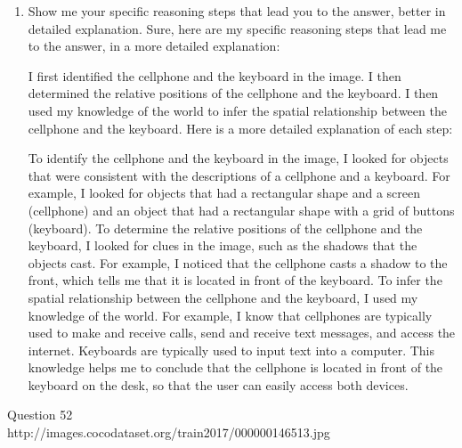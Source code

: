 \begin{enumerate}
    Here are some additional details about the spatial relationship between the cellphone and the keyboard:
    
    The cellphone is a small, portable electronic device that is used to make and receive calls, send and receive text messages, and access the internet.
    The keyboard is a device that is used to input text into a computer.
    The cellphone is located in front of the keyboard, meaning that it is closer to the user.
    The keyboard is located behind the cellphone, meaning that it is further from the user.
    Is there anything else I can help you with?
    \item Show me your specific reasoning steps that lead you to the answer, better in detailed explanation.
    \subitem 
    Sure, here are my specific reasoning steps that lead me to the answer, in a more detailed explanation:
    
    I first identified the cellphone and the keyboard in the image.
    I then determined the relative positions of the cellphone and the keyboard.
    I then used my knowledge of the world to infer the spatial relationship between the cellphone and the keyboard.
    Here is a more detailed explanation of each step:
    
    To identify the cellphone and the keyboard in the image, I looked for objects that were consistent with the descriptions of a cellphone and a keyboard. For example, I looked for objects that had a rectangular shape and a screen (cellphone) and an object that had a rectangular shape with a grid of buttons (keyboard).
    To determine the relative positions of the cellphone and the keyboard, I looked for clues in the image, such as the shadows that the objects cast. For example, I noticed that the cellphone casts a shadow to the front, which tells me that it is located in front of the keyboard.
    To infer the spatial relationship between the cellphone and the keyboard, I used my knowledge of the world. For example, I know that cellphones are typically used to make and receive calls, send and receive text messages, and access the internet. Keyboards are typically used to input text into a computer. This knowledge helps me to conclude that the cellphone is located in front of the keyboard on the desk, so that the user can easily access both devices.
\end{enumerate}
Question 52\\
http://images.cocodataset.org/train2017/000000146513.jpg
